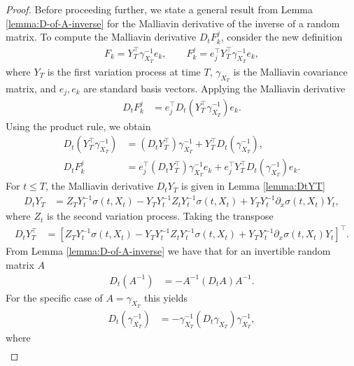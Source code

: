 \documentclass[]{interact}
\newcommand{\1}{\mathbf{1}}
\theoremstyle{plain}%
\theoremstyle{definition}
\theoremstyle{remark}
\numberwithin{equation}{section}
\begin{document}
\begin{proof}
%
Before proceeding further, we state a general result from Lemma \ref{lemma:D-of-A-inverse} for the Malliavin derivative of the inverse of a random matrix.
To compute the Malliavin derivative \( D_t F_k^j \), consider the new definition
\begin{align*}
F_k = Y_T^\top \gamma_{X_T}^{-1} e_k, \qquad 
F_k^j = e_j^\top Y_T^\top \gamma_{X_T}^{-1} e_k,
\end{align*}
where \( Y_T \) is the first variation process at time \( T \), \( \gamma_{X_T} \) is the Malliavin covariance matrix, and \( e_j, e_k \) are standard basis vectors. Applying the Malliavin derivative
\begin{align*}
D_t F_k^j &= e_j^\top D_t (Y_T^\top \gamma_{X_T}^{-1}) e_k.
\end{align*}
Using the product rule, we obtain
\begin{align*}
D_t (Y_T^\top \gamma_{X_T}^{-1}) &= (D_t Y_T^\top) \gamma_{X_T}^{-1} + Y_T^\top D_t (\gamma_{X_T}^{-1}), \\
D_t F_k^j &= e_j^\top (D_t Y_T^\top) \gamma_{X_T}^{-1} e_k + e_j^\top Y_T^\top D_t (\gamma_{X_T}^{-1}) e_k.
\end{align*}
%
For \( t \leq T \), the Malliavin derivative \( D_t Y_T \) is given in Lemma \ref{lemma:DtYT} 
\begin{align*}
D_t Y_T &= Z_T Y_t^{-1} \sigma(t, X_t) - Y_T Y_t^{-1} Z_t Y_t^{-1} \sigma(t, X_t) + Y_T Y_t^{-1} \partial_x \sigma(t, X_t) Y_t,
\end{align*}
where \( Z_t \) is the second variation process. Taking the transpose
\begin{align*}
D_t Y_T^\top &= \left[ Z_T Y_t^{-1} \sigma(t, X_t) - Y_T Y_t^{-1} Z_t Y_t^{-1} \sigma(t, X_t) + Y_T Y_t^{-1} \partial_x \sigma(t, X_t) Y_t \right]^\top.
\end{align*}
%
From  Lemma \ref{lemma:D-of-A-inverse} we have that for an invertible random matrix \( A \)
\begin{align*}
D_t (A^{-1}) &= - A^{-1} (D_t A) A^{-1}. 
\end{align*}
For the specific case of \( A = \gamma_{X_T} \) this yields
\begin{align*}
D_t (\gamma_{X_T}^{-1}) &= - \gamma_{X_T}^{-1} (D_t \gamma_{X_T}) \gamma_{X_T}^{-1},
\end{align*}
where
\begin{align*}

\end{align*}
\end{proof}
\end{document}
